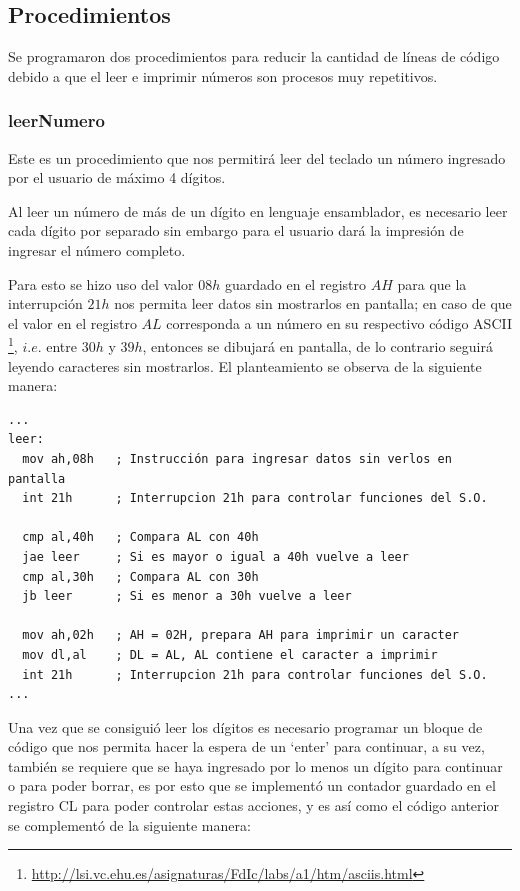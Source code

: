 \documentclass[letter,12 pt,titlepage]{article}
\begin{document}
    \subsection{Procedimientos}

    Se programaron dos procedimientos para reducir la cantidad de líneas de código debido a que el leer e imprimir números son procesos muy repetitivos.

    \subsubsection{leerNumero}
    Este es un procedimiento que nos permitirá leer del teclado un número ingresado por el usuario de máximo 4 dígitos.

    Al leer un número de más de un dígito en lenguaje ensamblador, es necesario leer cada dígito por separado sin embargo para el usuario dará la impresión de ingresar el número completo.

    Para esto se hizo uso del valor $08h$ guardado en el registro $AH$ para que la interrupción $21h$ nos permita leer datos sin mostrarlos en pantalla; en caso de  que el valor en el registro $AL$ corresponda a un número en su respectivo código ASCII \footnote{\url{http://lsi.vc.ehu.es/asignaturas/FdIc/labs/a1/htm/asciis.html}}, $i.e.$ entre $30h$ y $39h$, entonces se dibujará en pantalla, de lo contrario seguirá leyendo caracteres sin mostrarlos. El planteamiento se observa de la siguiente manera:

    \begin{verbatim}
...
leer:
  mov ah,08h   ; Instrucción para ingresar datos sin verlos en pantalla
  int 21h      ; Interrupcion 21h para controlar funciones del S.O.

  cmp al,40h   ; Compara AL con 40h
  jae leer     ; Si es mayor o igual a 40h vuelve a leer
  cmp al,30h   ; Compara AL con 30h
  jb leer      ; Si es menor a 30h vuelve a leer

  mov ah,02h   ; AH = 02H, prepara AH para imprimir un caracter
  mov dl,al    ; DL = AL, AL contiene el caracter a imprimir
  int 21h      ; Interrupcion 21h para controlar funciones del S.O.
...
    \end{verbatim}
    
    Una vez que se consiguió leer los dígitos es necesario programar un bloque de código que nos permita hacer la espera de un `enter' para continuar, a su vez, también se requiere que se haya ingresado por lo menos un dígito para continuar o para poder borrar, es por esto que se implementó un contador guardado en el registro CL para poder controlar estas acciones, y es así como el código anterior se complementó de la siguiente manera:
\end{document}
